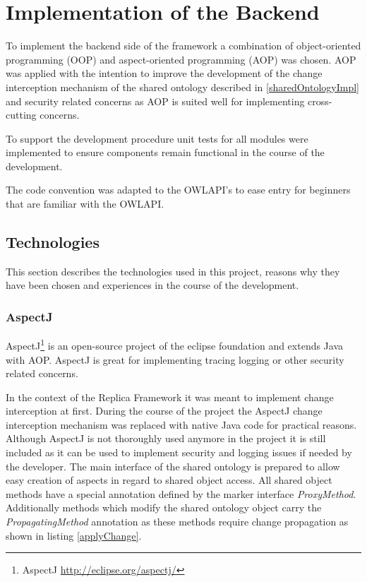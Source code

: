 \chapter{Implementation of the Backend}
\label{backendimplementation}
To implement the backend side of the framework a combination of object-oriented
programming (OOP) and aspect-oriented programming (AOP) was chosen.
AOP was applied with the
intention to improve the development of the change interception mechanism of the shared
ontology described in \ref{sharedOntologyImpl} and security related concerns as AOP
is suited well for implementing cross-cutting concerns.

To support the development procedure unit tests for all modules were implemented to
ensure components remain functional in the course of the development.

The code convention was adapted to the OWLAPI's to ease entry for beginners that
are familiar with the OWLAPI.


\section{Technologies}
This section describes the technologies used in this project, reasons
why they have been chosen and experiences in the course of the development.

\subsection{AspectJ}
AspectJ\footnote{AspectJ \url{http://eclipse.org/aspectj/}} is an open-source
project of the eclipse foundation and extends Java with AOP.
AspectJ is great for implementing tracing logging or
other security related concerns.

In the context of the Replica Framework it was meant to implement 
change interception at first. During the course of the project the 
AspectJ change interception mechanism was replaced with native Java 
code for practical reasons. Although AspectJ is not thoroughly used anymore
in the project it is still included as it can be used to implement security
and logging issues if needed by the developer. The main interface of the
shared ontology is prepared to allow easy creation of aspects in 
regard to shared object access. All shared object methods have a 
special annotation defined by the marker interface \emph{ProxyMethod}.
Additionally methods which modify the shared ontology object carry the
\emph{PropagatingMethod} annotation as these methods require change
propagation as shown in listing \ref{applyChange}.

